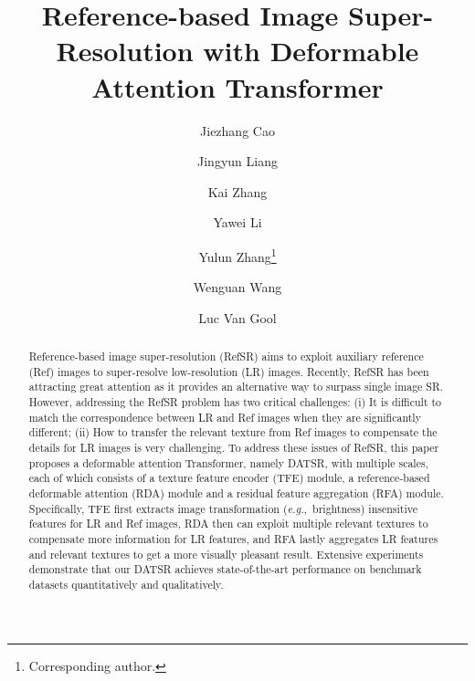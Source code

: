 \documentclass[runningheads]{llncs}
\def\eg{\mbox{\textit{e.g.}, }}
\begin{document}
\pagestyle{headings}
\mainmatter
\def\ECCVSubNumber{2105}  

\title{Reference-based Image Super-Resolution with Deformable Attention Transformer} 



\author{Jiezhang Cao \and 
        Jingyun Liang \and
        Kai Zhang \and
        Yawei Li \and 
        Yulun Zhang\thanks{Corresponding author.} \and 
        Wenguan Wang \and
        Luc Van Gool
        }
 
\maketitle

\begin{abstract}
Reference-based image super-resolution (RefSR) aims to exploit auxiliary reference (Ref) images to super-resolve low-resolution (LR) images. Recently, RefSR has been attracting great attention as it provides an alternative way to surpass single image SR. However, addressing the RefSR problem has two critical challenges: (i) It is difficult to match the correspondence between LR and Ref images when they are significantly different; (ii) How to transfer the relevant texture from Ref images to compensate the details for LR images is very challenging. To address these issues of RefSR, this paper proposes a deformable attention Transformer, namely DATSR, with multiple scales, each of which consists of a texture feature encoder (TFE) module, a reference-based deformable attention (RDA) module and a residual feature aggregation (RFA) module. Specifically, TFE first extracts image transformation (\eg brightness) insensitive features for LR and Ref images, RDA then can exploit multiple relevant textures to compensate more information for LR features, and RFA lastly aggregates LR features and relevant textures to get a more visually pleasant result. Extensive experiments demonstrate that our DATSR achieves state-of-the-art performance on benchmark datasets quantitatively and qualitatively. 
\end{abstract}
\end{document}
